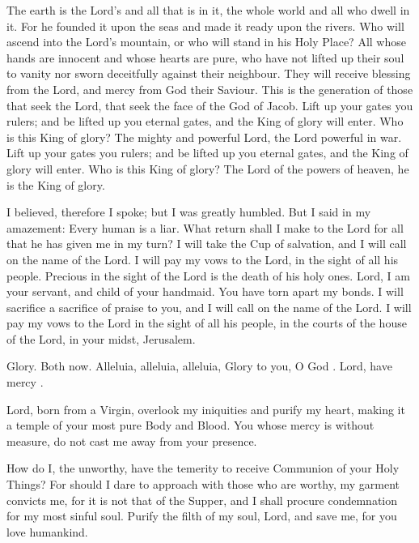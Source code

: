
The earth is the Lord's and all that is in it, the whole world and all who dwell in it. For he founded it upon the seas and made it ready upon the rivers. Who will ascend into the Lord's mountain, or who will stand in his Holy Place? All whose hands are innocent and whose hearts are pure, who have not lifted up their soul to vanity nor sworn deceitfully against their neighbour. They will receive blessing from the Lord, and mercy from God their Saviour. This is the generation of those that seek the Lord, that seek the face of the God of Jacob. Lift up your gates you rulers; and be lifted up you eternal gates, and the King of glory will enter. Who is this King of glory? The mighty and powerful Lord, the Lord powerful in war. Lift up your gates you rulers; and be lifted up you eternal gates, and the King of glory will enter. Who is this King of glory? The Lord of the powers of heaven, he is the King of glory.


I believed, therefore I spoke; but I was greatly humbled. But I said in my amazement: Every human is a liar. What return shall I make to the Lord for all that he has given me in my turn? I will take the Cup of salvation, and I will call on the name of the Lord. I will pay my vows to the Lord, in the sight of all his people. Precious in the sight of the Lord is the death of his holy ones. Lord, I am your servant, and child of your handmaid. You have torn apart my bonds. I will sacrifice a sacrifice of praise to you, and I will call on the name of the Lord. I will pay my vows to the Lord in the sight of all his people, in the courts of the house of the Lord, in your midst, Jerusalem.

Glory. Both now. Alleluia, alleluia, alleluia, Glory to you, O God . Lord, have mercy .


Lord, born from a Virgin, overlook my iniquities and purify my heart, making it a temple of your most pure Body and Blood. You whose mercy is without measure, do not cast me away from your presence.


How do I, the unworthy, have the temerity to receive Communion of your Holy Things? For should I dare to approach with those who are worthy, my garment convicts me, for it is not that of the Supper, and I shall procure condemnation for my most sinful soul. Purify the filth of my soul, Lord, and save me, for you love humankind.


